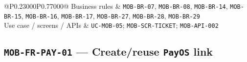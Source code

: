 \begin{longtable}{@{}P{0.23000\SRSWidth}P{0.77000\SRSWidth}@{}}
Business rules & \texttt{MOB-\allowbreak{}BR-\allowbreak{}07}, \texttt{MOB-\allowbreak{}BR-\allowbreak{}08}, \texttt{MOB-\allowbreak{}BR-\allowbreak{}14}, \texttt{MOB-\allowbreak{}BR-\allowbreak{}15}, \texttt{MOB-\allowbreak{}BR-\allowbreak{}16}, \texttt{MOB-\allowbreak{}BR-\allowbreak{}17}, \texttt{MOB-\allowbreak{}BR-\allowbreak{}27}, \texttt{MOB-\allowbreak{}BR-\allowbreak{}28}, \texttt{MOB-\allowbreak{}BR-\allowbreak{}29} \\[3pt]
Use case /\allowbreak{} screens /\allowbreak{} APIs & \texttt{UC-\allowbreak{}MOB-\allowbreak{}05}; \texttt{MOB-\allowbreak{}SCR-\allowbreak{}TICKET}; \texttt{MOB-\allowbreak{}API-\allowbreak{}002} \\[3pt]
\end{longtable}
\endgroup

\subsection{\texttt{MOB-\allowbreak{}FR-\allowbreak{}PAY-\allowbreak{}01} — Create/\allowbreak{}reuse \texttt{Pay\allowbreak{}OS} link}
\begingroup
\fontsize{9.5}{12}\selectfont
\setlength{\SRSWidth}{\dimexpr\linewidth-2\tabcolsep\relax}
